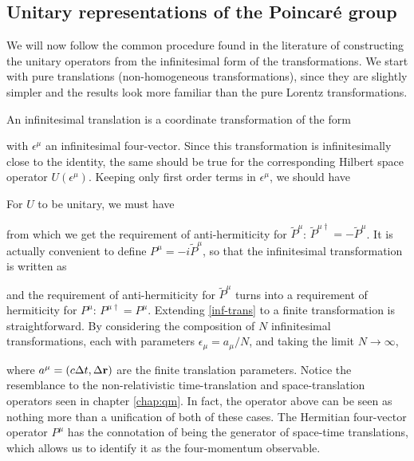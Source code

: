 \documentclass[12pt,a4paper,notitlepage]{report}
\begin{document}
\subsection{Unitary representations of the Poincaré group}

We will now follow the common procedure found in the literature of constructing the unitary operators from the infinitesimal form of the transformations. We start with pure translations (non-homogeneous transformations), since they are slightly simpler and the results look more familiar than the pure Lorentz transformations.

An infinitesimal translation is a coordinate transformation of the form

%
with $\epsilon^\mu$ an infinitesimal four-vector. Since this transformation is infinitesimally close to the identity, the same should be true for the corresponding Hilbert space operator $U(\epsilon^\mu)$. Keeping only first order terms in $\epsilon^\mu$, we should have

%
For $U$ to be unitary, we must have

%
from which we get the requirement of anti-hermiticity for $\tilde{P}^\mu$: $\tilde{P}^{\mu\dagger} = -\tilde{P}^\mu$. It is actually convenient to define $P^\mu = -i\tilde{P}^\mu$, so that the infinitesimal transformation is written as

%
and the requirement of anti-hermiticity for $\tilde{P}^\mu$ turns into a requirement of hermiticity for $P^\mu$: $P^{\mu\dagger} = P^\mu$. Extending \eqref{inf-trans} to a finite transformation is straightforward. By considering the composition of $N$ infinitesimal transformations, each with parameters $\epsilon_\mu = a_\mu/N$, and taking the limit $N \rightarrow \infty$,

%
where $a^\mu = (c\Delta t, \Delta \vb{r})$ are the finite translation parameters.
Notice the resemblance to the non-relativistic time-translation and space-translation operators seen in chapter \ref{chap:qm}. In fact, the operator above can be seen as nothing more than a unification of both of these cases. The Hermitian four-vector operator $P^\mu$ has the connotation of being the generator of space-time translations, which allows us to identify it as the four-momentum observable.
\end{document}

